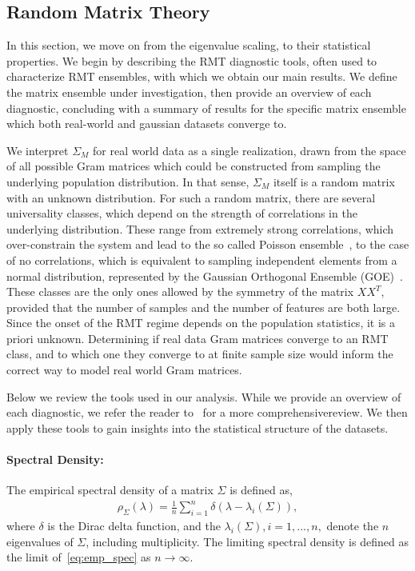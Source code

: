 \documentclass{article}
\begin{document}
\subsection{Random Matrix Theory}
\label{theory}



In this section, we move on from the eigenvalue scaling, to their statistical properties. We begin by describing the RMT diagnostic tools, often used to characterize RMT ensembles, with which we obtain our main results. We define the matrix ensemble under investigation, then provide an overview of each diagnostic, concluding with a summary of results for the specific matrix ensemble which both real-world and gaussian datasets converge to.

 We interpret $\Sigma_M$ for real world data as a single realization, drawn from the space of all possible Gram matrices which could be constructed from sampling the underlying population distribution. In that sense, $\Sigma_M$ itself is a random matrix with an unknown distribution. For such a random matrix, there are  several universality classes, which depend on the strength of correlations in the underlying distribution. These range from extremely strong correlations, which over-constrain the system and lead to the so called Poisson ensemble~\citep{r_ratios_theory_values}, to the case of no correlations, which is equivalent to sampling independent elements from a normal distribution, represented by the Gaussian Orthogonal Ensemble (GOE)~\citep{mehta_book}. These classes are the only ones allowed by the symmetry of the matrix $XX^T$, provided that the number of samples and the number of features are both large. 
Since the onset of the RMT regime depends on the population statistics, it is a priori unknown.
 Determining if real data Gram matrices converge to an RMT class, and to which one they converge to at finite sample size would inform the correct way to model real world Gram matrices. 

Below we review the tools used in our analysis. While we provide an overview of each diagnostic, we refer the reader to~\citet{tao2012topics, Kim_2023} for a more comprehensivereview. We then apply these tools to gain insights into the statistical structure of the datasets.

%
\paragraph{Spectral Density:}
The empirical spectral density of a matrix $\Sigma$ is defined as,
\begin{align}\label{eq:emp_spec}
    \rho_\Sigma(\lambda)
=\frac{1}{n}\sum_{i=1}^n
\delta(\lambda - \lambda_i(\Sigma)),
\end{align}
where $\delta$ is the Dirac delta function, and the $\lambda_i (\Sigma), i = 1, . . . , n,$ denote the $n$ eigenvalues of $\Sigma$,
including multiplicity. The limiting spectral density is defined as the limit of~\cref{eq:emp_spec} as $n \to \infty$.
\end{document}
